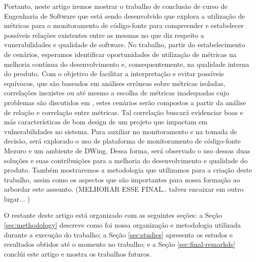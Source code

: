 Portanto, neste artigo iremos mostrar o trabalho de conclusão de curso de Engenharia de Software que está sendo desenvolvido que explora a utilização de métricas para o monitoramento de código-fonte para compreender e estabelecer possíveis relações existentes entre as mesmas no que diz respeito a vunerabilidades e qualidade de software. No trabalho,  partir do estabelecimento de cenários, esperamos identificar oportunidades de utilização de métricas na melhoria contínua do desenvolvimento e, consequentemente, na qualidade interna do produto. Com o objetivo de facilitar a interpretação e evitar possíveis equívocos, que são baseados em análises errôneas sobre métricas isoladas, correlações inexistes ou até mesmo a escolha de métricas inadequadas cujo problemas são discutidos em \cite{chidamber1994}, estes cenários serão compostos a partir da análise de relação e correlação entre métricas. Tal correlação buscará evidenciar boas e más características de bom design de um projeto que impactam em vulnerabilidades no sistema. Para auxiliar no monitoramento e na tomada de decisão, será explorado o uso de plataforma de monitoramento de código-fonte Mezuro e um ambiente de DWing. Dessa forma, será observado o uso dessas duas soluções e suas contribuições para a melhoria do desenvolvimento e qualidade do produto. Também mostraremos a metodologia que utilizamos para a criação deste trabalho, assim como os aspectos que são importantes para nossa formação ao arbordar este asssunto. (MELHORAR ESSE FINAL.. talvez encaixar em outro lugar... )

O restante deste artigo está organizado com as seguintes seções: a Seção \ref{sec:methodology} descreve como foi nossa organização e metodologia utilizada durante a execução do trabalho; a Seção \ref{sec:studies} apresenta os estudos e resultados obtidos até o momento no trabalho; e a Seção \ref{sec:final-remarkds} conclúi este artigo e mostra os trabalhos futuros.

